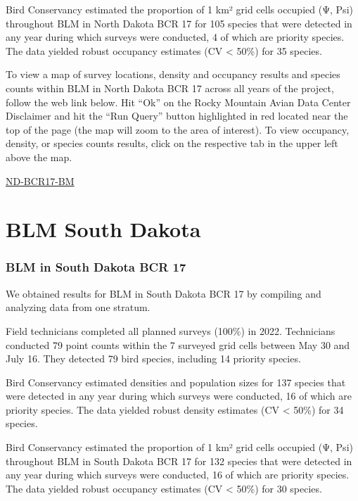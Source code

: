 \documentclass[
  letterpaper,
  DIV=11,
  numbers=noendperiod,
  oneside]{scrreprt}
\begin{document}
Bird Conservancy estimated the proportion of 1 km² grid cells occupied
(Ψ, Psi) throughout BLM in North Dakota BCR 17 for 105 species that were
detected in any year during which surveys were conducted, 4 of which are
priority species. The data yielded robust occupancy estimates (CV
\textless{} 50\%) for 35 species.

To view a map of survey locations, density and occupancy results and
species counts within BLM in North Dakota BCR 17 across all years of the
project, follow the web link below. Hit ``Ok'' on the Rocky Mountain
Avian Data Center Disclaimer and hit the ``Run Query'' button
highlighted in red located near the top of the page (the map will zoom
to the area of interest). To view occupancy, density, or species counts
results, click on the respective tab in the upper left above the map.

\href{http://www.rmbo.org/new_site/adc/QueryWindow.aspx\#N4IgzgLgTghhCuBbEAuABCAcgEQLQCEBhAJQEYB2AgWXX3igFMZ40B7AMzQBkYA7AEzRU+MAOYNEDXhBABfIA===}{ND-BCR17-BM}

\hypertarget{blm-south-dakota}{%
\section{BLM South Dakota}\label{blm-south-dakota}}

\hypertarget{blm-in-south-dakota-bcr-17}{%
\subsubsection{BLM in South Dakota BCR
17}\label{blm-in-south-dakota-bcr-17}}

We obtained results for BLM in South Dakota BCR 17 by compiling and
analyzing data from one stratum.

Field technicians completed all planned surveys (100\%) in 2022.
Technicians conducted 79 point counts within the 7 surveyed grid cells
between May 30 and July 16. They detected 79 bird species, including 14
priority species.

Bird Conservancy estimated densities and population sizes for 137
species that were detected in any year during which surveys were
conducted, 16 of which are priority species. The data yielded robust
density estimates (CV \textless{} 50\%) for 34 species.

Bird Conservancy estimated the proportion of 1 km² grid cells occupied
(Ψ, Psi) throughout BLM in South Dakota BCR 17 for 132 species that were
detected in any year during which surveys were conducted, 16 of which
are priority species. The data yielded robust occupancy estimates (CV
\textless{} 50\%) for 30 species.
\end{document}
